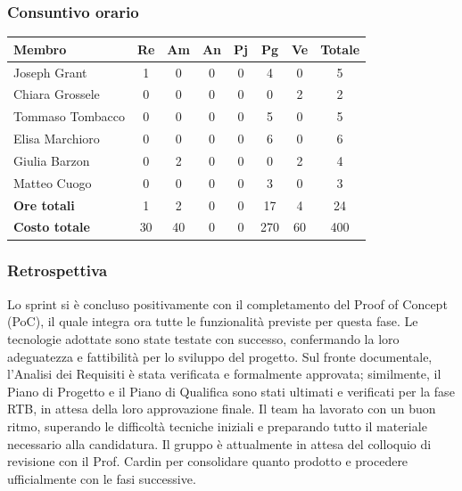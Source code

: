 \documentclass[11pt,a4paper]{article}
\begin{document}
\subsubsection{Consuntivo orario}
\begin{center}
    \begin{tabular}{|l|c|c|c|c|c|c|c|}
        \hline
        \textbf{Membro} & \textbf{Re} & \textbf{Am} & \textbf{An} & \textbf{Pj} & \textbf{Pg} & \textbf{Ve} & \textbf{Totale} \\
        \hline
        Joseph Grant & 1 & 0 & 0 & 0 & 4 & 0 & 5 \\
        \hline
        Chiara Grossele & 0 & 0 & 0 & 0 & 0 & 2 & 2 \\
        \hline
        Tommaso Tombacco & 0 & 0 & 0 & 0 & 5 & 0 & 5 \\
        \hline
        Elisa Marchioro & 0 & 0 & 0 & 0 & 6 & 0 & 6 \\
        \hline
        Giulia Barzon & 0 & 2 & 0 & 0 & 0 & 2 & 4 \\
        \hline
        Matteo Cuogo & 0 & 0 & 0 & 0 & 3 & 0 & 3 \\
        \hline
        \textbf{Ore totali} & 1 & 2 & 0 & 0 & 17 & 4 & 24 \\
        \hline
        \textbf{Costo totale} & 30 & 40 & 0 & 0 & 270 & 60 & 400 \\
        \hline
    \end{tabular}
\end{center}

\subsubsection{Retrospettiva}
Lo sprint si è concluso positivamente con il completamento del Proof of Concept (PoC), il quale integra ora tutte le funzionalità previste per questa fase. Le tecnologie adottate sono state testate con successo, confermando la loro adeguatezza e fattibilità per lo sviluppo del progetto. Sul fronte documentale, l'Analisi dei Requisiti è stata verificata e formalmente approvata; similmente, il Piano di Progetto e il Piano di Qualifica sono stati ultimati e verificati per la fase RTB, in attesa della loro approvazione finale. Il team ha lavorato con un buon ritmo, superando le difficoltà tecniche iniziali e preparando tutto il materiale necessario alla candidatura. Il gruppo è attualmente in attesa del colloquio di revisione con il Prof. Cardin per consolidare quanto prodotto e procedere ufficialmente con le fasi successive.
\end{document}
